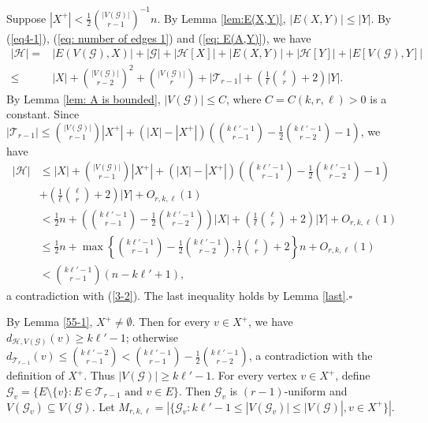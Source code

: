 \documentclass[12pt]{article}%
\newenvironment{proof}{{\noindent\it Proof.}}{\hfill $\square$\par}
\newcommand{\mh}{\mathcal{H}}
\newcommand{\mg}{\mathcal{G}}
\begin{document}
\begin{proof} Suppose  $|X^+|< \frac{1}{2}\binom{|V(\mg)|}{r-1}^{-1}n$.
    By Lemma \ref{lem:E(X,Y)}, $|E(X,Y)|\leq |Y|$.  By (\ref{eq4-1}),   (\ref{eq: number of edges 1}) and (\ref{eq: E(A,Y)}), we have
    \begin{equation*}
        \begin{aligned}
    |\mh|=&|E(V(\mg),X)|+|\mg|+|\mh[X]|+|E(X,Y)|+|\mh[Y]|+|E[V(\mg),Y]|\\
            \leq & |X|+\binom{|V(\mg)|}{r-2}^2+\binom{|V(\mg)|}{r}+|\mathcal{T}_{r-1}|+\left(\frac{1}{\ell}\binom{\ell}{r}+2\right)|Y|.
        \end{aligned}
    \end{equation*}
    By Lemma \ref{lem: A is bounded}, $|V(\mg)|\leq C$, where $C=C(k,r,\ell)>0$
     is a constant.
Since $|\mathcal{T}_{r-1}|\leq \binom{|V(\mg)|}{r-1}|X^+|+(|X|-|X^+|)\left(\binom{k\ell'-1}{r-1}-\frac{1}{2}\binom{k\ell'-1}{r-2}-1\right)$,  we have
\begin{equation*}
    \begin{aligned}
        |\mh| &\leq  |X|+\binom{|V(\mg)|}{r-1}|X^+|+(|X|-|X^+|)\left(\binom{k\ell'-1}{r-1}-\frac{1}{2}\binom{k\ell'-1}{r-2}-1\right)\\
        &+\left(\frac{1}{\ell}\binom{\ell}{r}+2\right)|Y|+O_{r,k,\ell}(1)\\
        &< \frac{1}{2}n+\left(\binom{k\ell'-1}{r-1}-\frac{1}{2}\binom{k\ell'-1}{r-2}\right)|X|+\left(\frac{1}{\ell}\binom{\ell}{r}+2\right)|Y|+O_{r,k,\ell}(1)\\
        &\leq \frac{1}{2}n+\max\left\{\binom{k\ell'-1}{r-1}-\frac{1}{2}\binom{k\ell'-1}{r-2},\frac{1}{\ell}\binom{\ell}{r}+2\right\}n+O_{r,k,\ell}(1)\\
        &<\binom{k\ell'-1}{r-1}(n-k\ell'+1),
    \end{aligned}
\end{equation*}
a contradiction with (\ref{3-2}). The last inequality holds by Lemma \ref{last}.\end{proof}


By Lemma \ref{55-1}, $X^+\not=\emptyset$.
Then for every $v\in X^+$, we have $d_{\mh,V(\mg)}(v)\geq k\ell'-1$; otherwise $d_{\mathcal{T}_{r-1}}(v)\leq \binom{k\ell'-2}{r-1}<\binom{k\ell'-1}{r-1}-\frac{1}{2}\binom{k\ell'-1}{r-2}$, a contradiction with the definition of $X^{+}$. Thus
$|V(\mg)|\geq k\ell'-1$.
For every vertex $v\in X^+$,  define $\mg_v=\{E\setminus\{v\}: E\in \mathcal{T}_{r-1} \text{~and~} v\in E\}$. Then $\mg_v$ is  $(r-1)$-uniform and $V(\mg_v)\subseteq V(\mg)$. Let $M_{r,k,\ell}=|\{\mg_v: k\ell'-1\le |V(\mg_v)|\le |V(\mg)|,v\in X^+\}|$.
\end{document}
